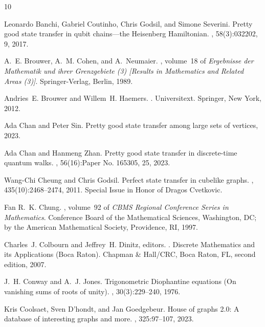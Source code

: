 \documentclass{article}
\numberwithin{equation}{section}
\begin{document}
\begin{thebibliography}{10}

Leonardo Banchi, Gabriel Coutinho, Chris Godsil, and Simone Severini.
\newblock Pretty good state transfer in qubit chains---the {H}eisenberg {H}amiltonian.
, 58(3):032202, 9, 2017.

A.~E. Brouwer, A.~M. Cohen, and A.~Neumaier.
, volume~18 of {\em Ergebnisse der Mathematik und ihrer Grenzgebiete (3) [Results in Mathematics and Related Areas (3)]}.
\newblock Springer-Verlag, Berlin, 1989.

Andries~E. Brouwer and Willem~H. Haemers.
.
\newblock Universitext. Springer, New York, 2012.

Ada Chan and Peter Sin.
\newblock Pretty good state transfer among large sets of vertices, 2023.

Ada Chan and Hanmeng Zhan.
\newblock Pretty good state transfer in discrete-time quantum walks.
, 56(16):Paper No. 165305, 25, 2023.

Wang-Chi Cheung and Chris Godsil.
\newblock Perfect state transfer in cubelike graphs.
, 435(10):2468--2474, 2011.
\newblock Special Issue in Honor of Dragos Cvetkovic.

Fan R.~K. Chung.
, volume~92 of {\em CBMS Regional Conference Series in Mathematics}.
\newblock Conference Board of the Mathematical Sciences, Washington, DC; by the American Mathematical Society, Providence, RI, 1997.

Charles~J. Colbourn and Jeffrey~H. Dinitz, editors.
.
\newblock Discrete Mathematics and its Applications (Boca Raton). Chapman \& Hall/CRC, Boca Raton, FL, second edition, 2007.

J.~H. Conway and A.~J. Jones.
\newblock Trigonometric {D}iophantine equations ({O}n vanishing sums of roots of unity).
, 30(3):229--240, 1976.

Kris Coolsaet, Sven D’hondt, and Jan Goedgebeur.
\newblock House of graphs 2.0: A database of interesting graphs and more.
, 325:97--107, 2023.


\end{thebibliography}
\end{document}
